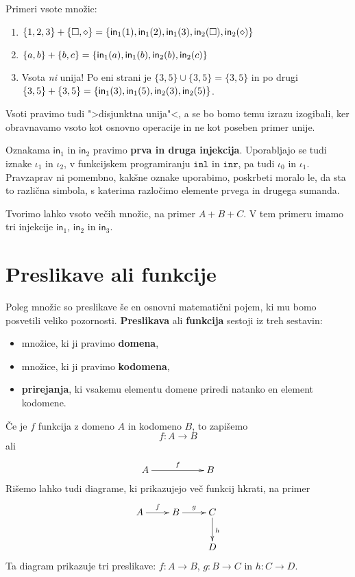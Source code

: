 \begin{primer}
Primeri vsote množic:
%
\begin{enumerate}

\item $\{1, 2, 3\} + \{\square, \diamond\} = \{\mathsf{in}_1(1), \mathsf{in}_1(2), \mathsf{in}_1(3), \mathsf{in}_2(\Box), \mathsf{in}_2(\diamond)\}$

\item $\{a, b\} + \{b, c\} = \{\mathsf{in}_1(a), \mathsf{in}_1(b), \mathsf{in}_2(b), \mathsf{in}_2(c)\}$

\item Vsota \emph{ni} unija! Po eni strani je
      $\{3, 5\} \cup \{3, 5\} = \{3, 5\}$ in po drugi
      $\{3, 5\} + \{3, 5\} = \{\mathsf{in}_1(3), \mathsf{in}_1(5), \mathsf{in}_2(3), \mathsf{in}_2(5)\}$.
\end{enumerate}
\end{primer}

Vsoti pravimo tudi ">disjunktna unija"<, a se bo bomo temu izrazu izogibali, ker obravnavamo vsoto kot osnovno operacije in ne kot poseben primer unije.

Oznakama $\mathsf{in}_1$ in $\mathsf{in}_2$ pravimo \textbf{prva in druga injekcija}. Uporabljajo se tudi iznake $\iota_1$ in $\iota_2$, v funkcijskem
programiranju $\mathtt{inl}$ in $\mathtt{inr}$, pa tudi $\iota_0$ in $\iota_1$. Pravzaprav ni pomembno, kakšne oznake uporabimo, poskrbeti moralo
le, da sta to različna simbola, s katerima razločimo elemente prvega in drugega sumanda.

Tvorimo lahko vsoto večih množic, na primer $A + B + C$. V tem primeru imamo tri injekcije $\mathsf{in}_1$, $\mathsf{in}_2$ in $\mathsf{in}_3$.

\section{Preslikave ali funkcije}

Poleg množic so preslikave še en osnovni matematični pojem, ki mu bomo posvetili veliko pozornosti. \textbf{Preslikava} ali \textbf{funkcija} sestoji iz treh sestavin:
%
\begin{itemize}
\item množice, ki ji pravimo \textbf{domena},
\item množice, ki ji pravimo \textbf{kodomena},
\item \textbf{prirejanja}, ki vsakemu elementu domene priredi natanko en element kodomene.
\end{itemize}
%
Če je $f$ funkcija z domeno $A$ in kodomeno $B$, to zapišemo
%
\begin{equation*}
  f : A \to B
\end{equation*}
%
ali
%
\begin{equation*}
  \xymatrix{
    {A} \ar[rr]^{f} & & {B}
  }
\end{equation*}
%
Rišemo lahko tudi diagrame, ki prikazujejo več funkcij hkrati, na primer
%
\begin{equation*}
  \xymatrix{
    {A} \ar[r]^{f} &
    {B} \ar[r]^{g} &
    {C} \ar[d]^{h} \\
    & & {D}
  }
\end{equation*}
%
Ta diagram prikazuje tri preslikave: $f : A \to B$, $g : B \to C$ in $h : C \to D$.


